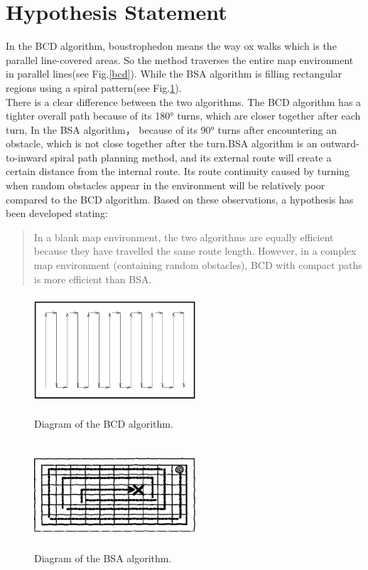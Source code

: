 \documentclass[conference]{IEEEtran}
\begin{document}
\section{Hypothesis Statement}
In the BCD algorithm, boustrophedon\cite{choset1998coverage} means the way ox walks which is the parallel line-covered areas. So the method traverses the entire map environment in parallel lines(see Fig.\ref{bcd}). While the BSA algorithm\cite{Gonzlez2003BSAAC} is filling rectangular regions using a spiral pattern(see Fig.\ref{bsa}).\\
There is a clear difference between the two algorithms. The BCD algorithm has a tighter overall path because of its 180° turns, which are closer together after each turn, In the BSA algorithm， because of its 90° turns after encountering an obstacle, which is not close together after the turn.BSA algorithm is an outward-to-inward spiral path planning method, and its external route will create a certain distance from the internal route. Its route continuity caused by turning when random obstacles appear in the environment will be relatively poor compared to the BCD algorithm.
Based on these observations, a hypothesis has been developed stating:
\begin{quote}
   In a blank map environment, the two algorithms are equally efficient because they have travelled the same route length. However, in a complex map environment (containing random obstacles), BCD with compact paths is more efficient than BSA.
\end{quote}

\begin{figure}[htbp]
\centering
\begin{minipage}[t]{0.48\textwidth}
\centering
\includegraphics[width=6cm,height=4cm]{RS_Report/bcd.png}
\caption{Diagram of the BCD algorithm\cite{choset1998coverage}. }
\label{bcd}
\end{minipage}
\begin{minipage}[t]{0.48\textwidth}
\centering
\includegraphics[width=6cm,height=4cm]{RS_Report/BSA.png}
\caption{Diagram of the BSA algorithm\cite{Gonzlez2003BSAAC}.}
\label{bsa}
\end{minipage}
\end{figure}
\end{document}
